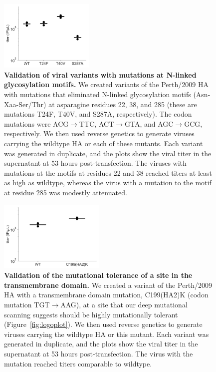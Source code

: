 \documentclass[9pt,twoside,lineno]{pnas-new}
\begin{document}
\begin{figure}
\centerline{\includegraphics[width=0.4\textwidth]{figs/supp_point_mut_validation/glycan_titers.pdf}}
\caption{\label{suppfig:glycan_validation}
{\bf Validation of viral variants with mutations at N-linked glycosylation motifs.}
We created variants of the Perth/2009 HA with mutations that eliminated N-linked glycosylation motifs (Asn-Xaa-Ser/Thr) at asparagine residues 22, 38, and 285 (these are mutations T24F, T40V, and S287A, respectively).
The codon mutations were ACG$\rightarrow$TTC, ACT$\rightarrow$GTA, and AGC$\rightarrow$GCG, respectively.
We then used reverse genetics to generate viruses carrying the wildtype HA or each of these mutants.
Each variant was generated in duplicate, and the plots show the viral titer in the supernatant at 53 hours post-transfection.
The viruses with mutations at the motifs at residues 22 and 38 reached titers at least as high as wildtype, whereas the virus with a mutation to the motif at residue 285 was modestly attenuated.
}
\end{figure}
\FloatBarrier

\begin{figure}
\centerline{\includegraphics[width=0.45\textwidth]{figs/supp_point_mut_validation/tm_titers.pdf}}
\caption{\label{suppfig:TM_validation}
{\bf Validation of the mutational tolerance of a site in the transmembrane domain.}
We created a variant of the Perth/2009 HA with a transmembrane domain mutation, C199(HA2)K (codon mutation TGT$\rightarrow$AAG), at a site that our deep mutational scanning suggests should be highly mutationally tolerant (Figure~\ref{fig:logoplot}).
We then used reverse genetics to generate viruses carrying the wildtype HA or this mutant.
Each variant was generated in duplicate, and the plots show the viral titer in the supernatant at 53 hours post-transfection.
The virus with the mutation reached titers comparable to wildtype.
}
\end{figure}
\FloatBarrier
\end{document}
